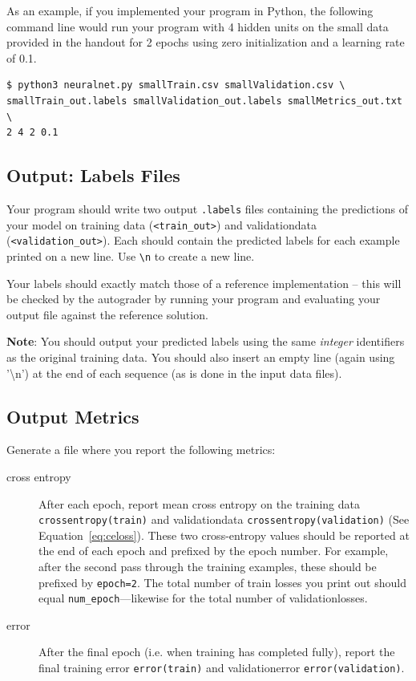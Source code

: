 \documentclass[11pt,addpoints,answers]{exam}
\begin{document}
As an example, if you implemented your program in Python, the following command line would run your program with 4 hidden units on the small data provided in the handout for 2 epochs using zero initialization and a learning rate of 0.1.
\\
\begin{lstlisting}[language=Shell]
$ python3 neuralnet.py smallTrain.csv smallValidation.csv \ 
smallTrain_out.labels smallValidation_out.labels smallMetrics_out.txt \ 
2 4 2 0.1
\end{lstlisting}

\subsection{Output: Labels Files} \label{output}
Your program should write two output \texttt{.labels} files containing the predictions of your model on training data (\texttt{<train\_out>}) and validation\thinspace data (\texttt{<validation\_out>}). Each should contain the predicted labels for each example printed on a new line. Use \lstinline{\n} to create a new line. 

Your labels should exactly match those of a reference implementation -- this will be checked by the autograder by running your program and evaluating your output file against the reference solution.

\textbf{Note}: You should output your predicted labels using the same \emph{integer} identifiers as the original training data. You should also insert an empty line (again using ’\textbackslash n’) at the end of each sequence (as is done in the input data files).

\newpage

\subsection{Output Metrics} \label{metrics}
Generate a file where you report the following metrics: 

\begin{description}
\item[cross entropy] After each epoch, report mean cross entropy on the training data \lstinline{crossentropy(train)} and validation\thinspace data \texttt{crossentropy(validation)} (See Equation~\ref{eq:celoss}). These two cross-entropy values should be reported at the end of each epoch and prefixed by the epoch number. For example, after the second pass through the training examples, these should be prefixed by \lstinline{epoch=2}. The total number of train losses you print out should equal \texttt{num\_epoch}---likewise for the total number of validation\thinspace losses.
\item[error] After the final epoch (i.e. when training has completed fully), report the final training error \lstinline{error(train)} and validation\thinspace error \texttt{error(validation)}. 
\end{description}
\end{document}
